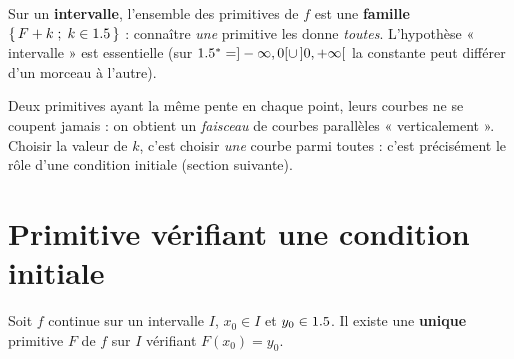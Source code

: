 \begin{aretenir}
Sur un \textbf{intervalle}, l'ensemble des primitives de $f$ est une \textbf{famille}
$\{\,F+k\;;\;k\in1.5\,\}$ : connaître \emph{une} primitive les donne \emph{toutes}.
L'hypothèse « intervalle » est essentielle (sur $1.5^{*}=]-\infty,0[\cup\,]0,+\infty[$ la
constante peut différer d'un morceau à l'autre).
\end{aretenir}

\begin{illus}
\end{illus}

\begin{remarque}
Deux primitives ayant la même pente en chaque point, leurs courbes ne se coupent jamais :
on obtient un \emph{faisceau} de courbes parallèles « verticalement ». Choisir la valeur de $k$,
c'est choisir \emph{une} courbe parmi toutes : c'est précisément le rôle d'une condition initiale
(section suivante).
\end{remarque}

\section{Primitive vérifiant une condition initiale}

\begin{theoreme}
Soit $f$ continue sur un intervalle $I$, $x_0\in I$ et $y_0\in1.5$. Il existe une
\textbf{unique} primitive $F$ de $f$ sur $I$ vérifiant $F(x_0)=y_0$.
\end{theoreme}

